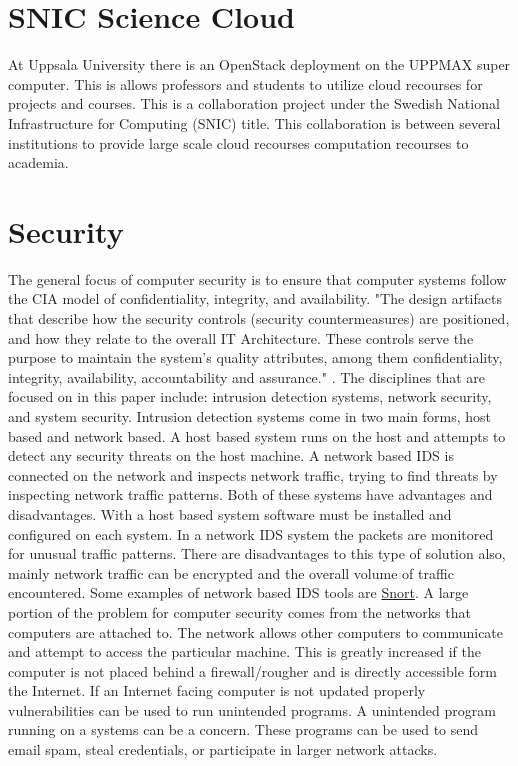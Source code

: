 \documentclass[12pt]{article}
\begin{document}
\section{SNIC Science Cloud}
At Uppsala University there is an OpenStack deployment on the UPPMAX super computer. This is allows professors and students to utilize cloud recourses for projects and courses.  This is a collaboration project under the Swedish National Infrastructure for Computing (SNIC) title.  This collaboration is between several institutions to provide large scale cloud recourses computation recourses to academia.

\section{Security}
The general focus of computer security is to ensure that computer systems follow the CIA model of confidentiality, integrity, and availability\cite{ComputerSecurity}. "The design artifacts that describe how the security controls (security countermeasures) are positioned, and how they relate to the overall IT Architecture. These controls serve the purpose to maintain the system's quality attributes, among them confidentiality, integrity, availability, accountability and assurance." \cite{it_security_architecture}. The disciplines that are focused on in this paper include: intrusion detection systems, network security, and system security.
Intrusion detection systems come in two main forms, host based and network based. A host based system runs on the host and attempts to detect any security threats on the host machine. A network based IDS is connected on the network and inspects network traffic, trying to find threats by inspecting network traffic patterns. Both of these systems have advantages and disadvantages. With a host based system software must be installed and configured on each system. In a network IDS system the packets are monitored for unusual traffic patterns. There are disadvantages to this type of solution also, mainly network traffic can be encrypted and the overall volume of traffic encountered. Some examples of network based IDS tools are \href{https://www.snort.org/}{Snort}.
A large portion of the problem for computer security comes from the networks that computers are attached to. The network allows other computers to communicate and attempt to access the particular machine. This is greatly increased if the computer is not placed behind a firewall/rougher and is directly accessible form the Internet. If an Internet facing computer is not updated properly vulnerabilities can be used to run unintended programs.
A unintended program running on a systems can be a concern. These programs can be used to send email spam, steal credentials, or participate in larger network attacks.
\end{document}
